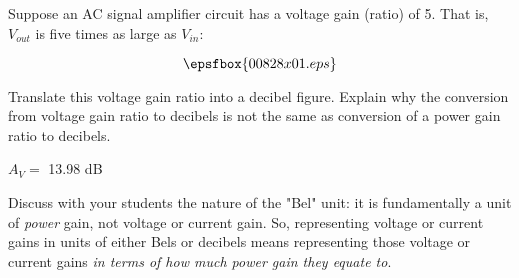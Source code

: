 

Suppose an AC signal amplifier circuit has a voltage gain (ratio) of 5.  That is, $V_{out}$ is five times as large as $V_{in}$:

$$\epsfbox{00828x01.eps}$$

Translate this voltage gain ratio into a decibel figure.  Explain why the conversion from voltage gain ratio to decibels is not the same as conversion of a power gain ratio to decibels.







$A_V =$ 13.98 dB







Discuss with your students the nature of the "Bel" unit: it is fundamentally a unit of {\it power} gain, not voltage or current gain.  So, representing voltage or current gains in units of either Bels or decibels means representing those voltage or current gains {\it in terms of how much power gain they equate to}.




